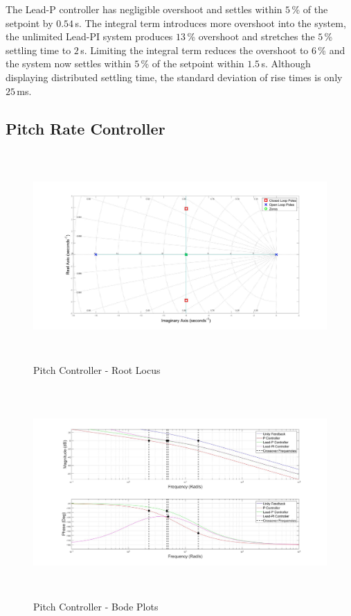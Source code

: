 \documentclass[12pt]{report}
\begin{document}
The Lead-P controller has negligible overshoot and settles within $5$\,\% of the setpoint by $0.54$\,s. The integral term introduces more overshoot into the system, the unlimited Lead-PI system produces $13$\,\% overshoot and stretches the $5$\,\% settling time to $2$\,s. Limiting the integral term reduces the overshoot to $6$\,\% and the system now settles within $5$\,\% of the setpoint within $1.5$\,s. Although displaying distributed settling time, the standard deviation of rise times is only $25$\,ms.

\subsection{Pitch Rate Controller}	

\begin{figure}[H]
	\centering
	\includegraphics[height = 8cm]{../Design/Matlab/Controllers/pitch_rate_root.jpg}
	\caption{Pitch Controller -  Root Locus}
	\label{IM_PitchControlRoot}
\end{figure}

\begin{figure}[H]
	\centering
	\includegraphics[height = 8cm]{../Design/Matlab/Controllers/pitch_rate_bode.jpg}
	\caption{Pitch Controller -  Bode Plots}
	\label{IM_PitchControlBode}
\end{figure}
\end{document}
